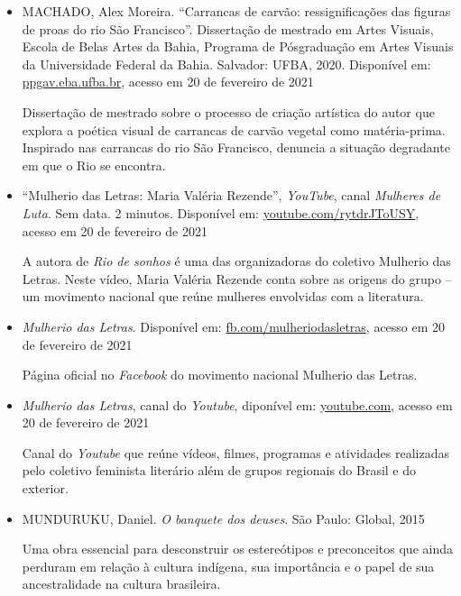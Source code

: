 \documentclass[12pt]{extarticle}
\begin{document}
\begin{itemize}
\item    MACHADO, Alex Moreira. ``Carrancas de carvão: ressignificações das
    figuras de proas do rio São Francisco''. Dissertação de mestrado em
    Artes Visuais, Escola de Belas Artes da Bahia, Programa de
    Pósgraduação em Artes Visuais da Universidade Federal da Bahia.
    Salvador: UFBA, 2020. Disponível em:
    \href{http://www.ppgav.eba.ufba.br/sites/ppgav.eba.ufba.br/files/2020_-_alex_moreira_machado.pdf}{ppgav.eba.ufba.br},
    acesso em 20 de fevereiro de 2021

    Dissertação de mestrado sobre o processo de criação artística do
    autor que explora a poética visual de carrancas de carvão vegetal
    como matéria-prima. Inspirado nas carrancas do rio São Francisco,
    denuncia a situação degradante em que o Rio se encontra.

\item    ``Mulherio das Letras: Maria Valéria Rezende'', \emph{YouTube},
    canal \emph{Mulheres de Luta}. Sem data. 2 minutos. Disponível em:
    \href{https://www.youtube.com/watch?v=rytdrJToUSY\&feature=emb_logo}{youtube.com/rytdrJToUSY},
    acesso em 20 de fevereiro de 2021

    A autora de \emph{Rio de sonhos} é uma das organizadoras do coletivo
    Mulherio das Letras. Neste vídeo, Maria Valéria Rezende conta sobre
    as origens do grupo -- um movimento nacional que reúne mulheres
    envolvidas com a literatura.

\item    \emph{Mulherio das Letras}. Disponível em:
    \href{https://pt-br.facebook.com/mulheriodasletras/}{fb.com/mulheriodasletras},
    acesso em 20 de fevereiro de 2021

    Página oficial no \emph{Facebook} do movimento nacional Mulherio das
    Letras.

\item    \emph{Mulherio das Letras}, canal do \emph{Youtube}, diponível em:
    \href{https://www.youtube.com/channel/UCzOwcQ9fdT5GmD8IJR_21SA/videos}{youtube.com},
    acesso em 20 de fevereiro de 2021

    Canal do \emph{Youtube} que reúne vídeos, filmes, programas e
    atividades realizadas pelo coletivo feminista literário além de
    grupos regionais do Brasil e do exterior.

\item    MUNDURUKU, Daniel. \emph{O banquete dos deuses}. São Paulo: Global,
    2015

    Uma obra essencial para desconstruir os estereótipos e preconceitos
    que ainda perduram em relação à cultura indígena, sua importância e
    o papel de sua ancestralidade na cultura brasileira.


\end{itemize}
\end{document}
